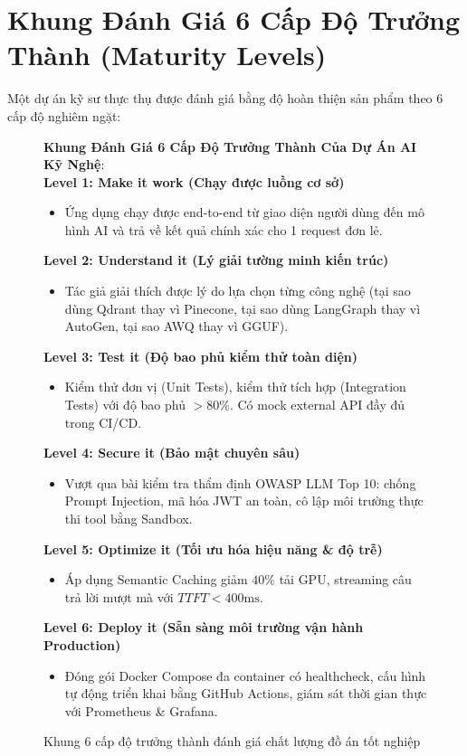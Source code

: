 \section{Khung Đánh Giá 6 Cấp Độ Trưởng Thành (Maturity Levels)}
\label{sec:capstone-maturity-levels}

Một dự án kỹ sư thực thụ được đánh giá bằng độ hoàn thiện sản phẩm theo 6 cấp độ nghiêm ngặt:

\begin{figure}[htbp]
\centering
\begin{tcolorbox}[colback=boxbg,colframe=primarycolor,width=0.95\textwidth,arc=2pt]
\small
\textbf{Khung Đánh Giá 6 Cấp Độ Trưởng Thành Của Dự Án AI Kỹ Nghệ}:\\[0.2cm]
\textbf{Level 1: Make it work (Chạy được luồng cơ sở)}
\begin{itemize}
  \item Ứng dụng chạy được end-to-end từ giao diện người dùng đến mô hình AI và trả về kết quả chính xác cho 1 request đơn lẻ.
\end{itemize}
\textbf{Level 2: Understand it (Lý giải tường minh kiến trúc)}
\begin{itemize}
  \item Tác giả giải thích được lý do lựa chọn từng công nghệ (tại sao dùng Qdrant thay vì Pinecone, tại sao dùng LangGraph thay vì AutoGen, tại sao AWQ thay vì GGUF).
\end{itemize}
\textbf{Level 3: Test it (Độ bao phủ kiểm thử toàn diện)}
\begin{itemize}
  \item Kiểm thử đơn vị (Unit Tests), kiểm thử tích hợp (Integration Tests) với độ bao phủ $> 80\%$. Có mock external API đầy đủ trong CI/CD.
\end{itemize}
\textbf{Level 4: Secure it (Bảo mật chuyên sâu)}
\begin{itemize}
  \item Vượt qua bài kiểm tra thẩm định OWASP LLM Top 10: chống Prompt Injection, mã hóa JWT an toàn, cô lập môi trường thực thi tool bằng Sandbox.
\end{itemize}
\textbf{Level 5: Optimize it (Tối ưu hóa hiệu năng \& độ trễ)}
\begin{itemize}
  \item Áp dụng Semantic Caching giảm $40\%$ tải GPU, streaming câu trả lời mượt mà với $TTFT < 400\text{ms}$.
\end{itemize}
\textbf{Level 6: Deploy it (Sẵn sàng môi trường vận hành Production)}
\begin{itemize}
  \item Đóng gói Docker Compose đa container có healthcheck, cấu hình tự động triển khai bằng GitHub Actions, giám sát thời gian thực với Prometheus \& Grafana.
\end{itemize}
\end{tcolorbox}
\caption{Khung 6 cấp độ trưởng thành đánh giá chất lượng đồ án tốt nghiệp}
\label{fig:capstone-maturity-matrix}
\end{figure}

